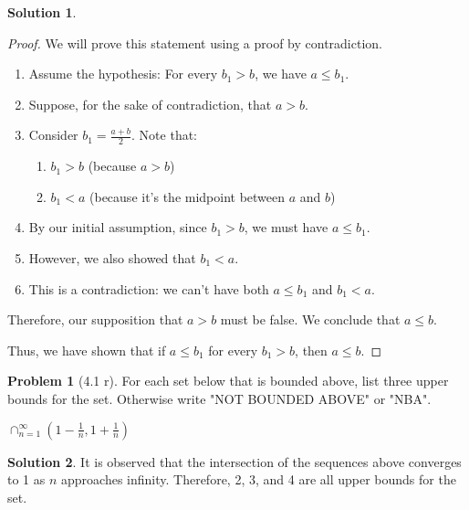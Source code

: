\documentclass[12pt]{article}
\theoremstyle{definition} %
\newtheorem{solution}{Solution}
\newtheorem{problem}{Problem}
\theoremstyle{plain} %
\begin{document}
\begin{solution}
    \begin{proof}
     We will prove this statement using a proof by contradiction.
    \begin{enumerate}
        \item Assume the hypothesis: For every $b_1 > b$, we have $a \leq b_1$.
        \item Suppose, for the sake of contradiction, that $a > b$.
        \item Consider $b_1 = \frac{a + b}{2}$. Note that:
        \begin{enumerate}
            \item $b_1 > b$ (because $a > b$)
            \item $b_1 < a$ (because it's the midpoint between $a$ and $b$)
        \end{enumerate}
        \item By our initial assumption, since $b_1 > b$, we must have $a \leq b_1$.
        \item However, we also showed that $b_1 < a$.
        \item This is a contradiction: we can't have both $a \leq b_1$ and $b_1 < a$.
    \end{enumerate}
    
    Therefore, our supposition that $a > b$ must be false. We conclude that $a \leq b$.
    
    Thus, we have shown that if $a \leq b_1$ for every $b_1 > b$, then $a \leq b$. 
    \end{proof}
    \end{solution}


\begin{problem}[4.1 r]
    
For each set below that is bounded above, list three upper bounds for the set. Otherwise write "NOT BOUNDED ABOVE" or "NBA".

$\cap_{n=1}^\infty\left( 1-\frac{1}{n}, 1+\frac{1}{n} \right)$ 

\end{problem}
\begin{solution}    
It is observed that the intersection of the sequences above converges to 1 as $n$ approaches infinity. Therefore, 2, 3, and 4 are all upper bounds for the set.
\end{solution}
\end{document}

